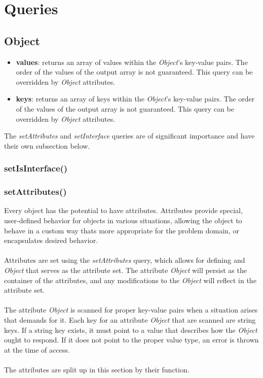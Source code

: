 \documentclass[12pt,letterpaper]{report}
\begin{document}
\chapter{Queries}\label{Queries}


\section{Object}\label{ObjectQueries}

\begin{itemize}
  \item \textbf{values}: returns an array of values within the \textit{Object}'s key-value pairs.
  The order of the values of the output array is not guaranteed. This query can be overridden by \textit{Object} 
  attributes.

  \item \textbf{keys}: returns an array of keys within the \textit{Object}'s key-value pairs.
  The order of the values of the output array is not guaranteed. This query can be overridden by \textit{Object} 
  attributes.     
   
\end{itemize}

The \textit{setAttributes} and \textit{setInterface} queries are of significant importance and have their own 
subsection below.

\subsection{setIsInterface()}\label{SetIsInterface}



\subsection{setAttributes()}\label{Attributes}

Every object has the potential to have attributes. Attributes provide special, user-defined 
behavior for objects in various situations, allowing the object to behave in a custom 
way thats more appropriate for the problem domain, or encapsulates desired behavior.
\\\\
Attributes are set using the \textit{setAttributes} query, which allows for defining 
and \textit{Object} that serves as the attribute set. The attribute \textit{Object}
will persist as the container of the attributes, and any modifications to the \textit{Object}
will reflect in the attribute set.
\\\\
The attribute \textit{Object} is scanned for proper key-value pairs when a situation 
arises that demands for it. Each key for an attribute \textit{Object} that are scanned 
are string keys. If a string key exists, it must point to a value that 
describes how the \textit{Object} ought to respond. If it does not point to the proper value type,
an error is thrown at the time of access.
\\\\
The attributes are split up in this section by their function.
\\\\
\end{document}
